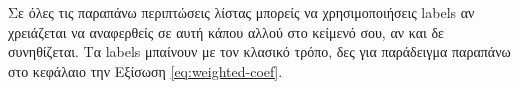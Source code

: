 Σε όλες τις παραπάνω περιπτώσεις λίστας μπορείς να χρησιμοποιήσεις labels αν χρειάζεται να αναφερθείς σε αυτή κάπου αλλού στο κείμενό σου, αν και δε συνηθίζεται. Τα labels μπαίνουν με τον κλασικό τρόπο, δες για παράδειγμα παραπάνω στο κεφάλαιο την Εξίσωση \ref{eq:weighted-coef}. 
